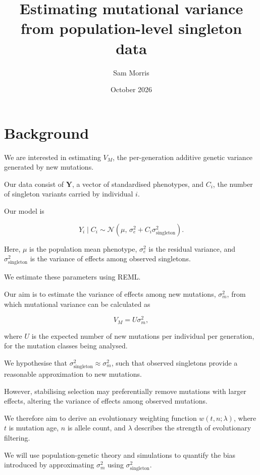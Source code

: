 \documentclass{article}
\title{Estimating mutational variance from population-level singleton data}
\author{Sam Morris}
\date{October 2026}
\begin{document}
\maketitle

\section{Background}

We are interested in estimating $V_M$, the per-generation additive genetic variance generated by new mutations.

Our data consist of $\boldsymbol{Y}$, a vector of standardised phenotypes, and $C_i$, the number of singleton variants carried by individual $i$.

Our model is

\begin{equation}
Y_i\mid C_i \sim
\mathcal{N}\left(
\mu,\,
\sigma_e^2+C_i\sigma_{\mathrm{singleton}}^2
\right).
\end{equation}

Here, $\mu$ is the population mean phenotype, $\sigma_e^2$ is the residual variance, and $\sigma_{\mathrm{singleton}}^2$ is the variance of effects among observed singletons.

We estimate these parameters using REML.

Our aim is to estimate the variance of effects among new mutations, $\sigma_m^2$, from which mutational variance can be calculated as

\begin{equation}
V_M=U\sigma_m^2,
\end{equation}

where $U$ is the expected number of new mutations per individual per generation, for the mutation classes being analysed.

We hypothesise that
$\sigma_{\mathrm{singleton}}^2\approx\sigma_m^2$,
such that observed singletons provide a reasonable approximation to new mutations.

However, stabilising selection may preferentially remove mutations with larger effects, altering the variance of effects among observed mutations.

We therefore aim to derive an evolutionary weighting function $w(t,n;\lambda)$, where $t$ is mutation age, $n$ is allele count, and $\lambda$ describes the strength of evolutionary filtering.

We will use population-genetic theory and simulations to quantify the bias introduced by approximating $\sigma_m^2$ using $\sigma_{\mathrm{singleton}}^2$.
\end{document}
